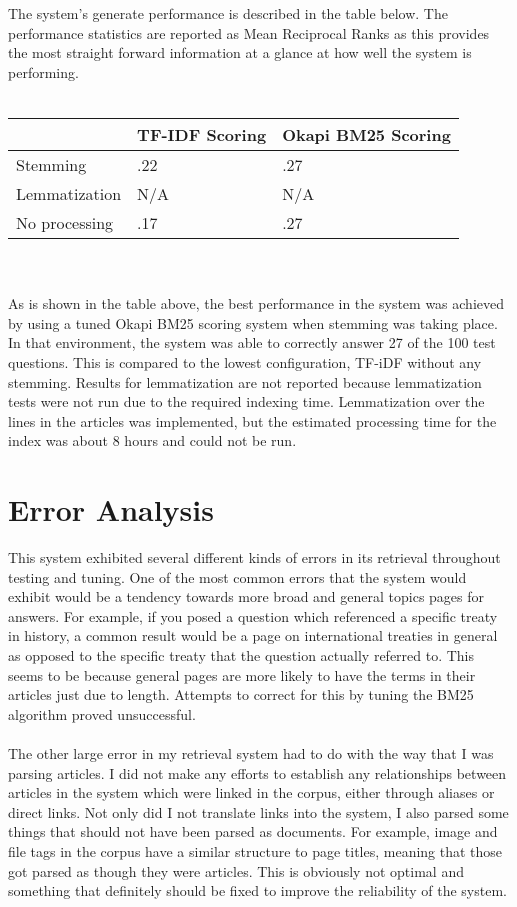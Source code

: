 \documentclass{article}%
\begin{document}
The system's generate performance is described in the table below. The performance statistics are reported as Mean Reciprocal Ranks as
this provides the most straight forward information at a glance at how well the system is performing.\\
\\
\begin{tabular}{| l | l | l |}
    \hline
                    & TF-IDF Scoring    & Okapi BM25 Scoring \\ \hline
    Stemming        & .22               & .27 \\ \hline
    Lemmatization   & N/A               & N/A \\ \hline
    No processing   & .17               & .27 \\ \hline
\end{tabular}\\
\\
As is shown in the table above, the best performance in the system was achieved by using a tuned Okapi BM25 scoring system when stemming
was taking place. In that environment, the system was able to correctly answer 27 of the 100 test questions. This is compared to the
lowest configuration, TF-iDF without any stemming. Results for lemmatization are not reported because lemmatization tests were not run due
to the required indexing time. Lemmatization over the lines in the articles was implemented, but the estimated processing time for the index
was about 8 hours and could not be run.

\section*{Error Analysis}

This system exhibited several different kinds of errors in its retrieval throughout testing and tuning. One of the most common errors that
the system would exhibit would be a tendency towards more broad and general topics pages for answers. For example, if you posed a question
which referenced a specific treaty in history, a common result would be a page on international treaties in general as opposed to the specific
treaty that the question actually referred to. This seems to be because general pages are more likely to have the terms in their articles just
due to length. Attempts to correct for this by tuning the BM25 algorithm proved unsuccessful.\\
\\
The other large error in my retrieval system had to do with the way that I was parsing articles. I did not make any efforts to establish any
relationships between articles in the system which were linked in the corpus, either through aliases or direct links. Not only did I not
translate links into the system, I also parsed some things that should not have been parsed as documents. For example, image and file tags
in the corpus have a similar structure to page titles, meaning that those got parsed as though they were articles. This is obviously not
optimal and something that definitely should be fixed to improve the reliability of the system.
\end{document}
